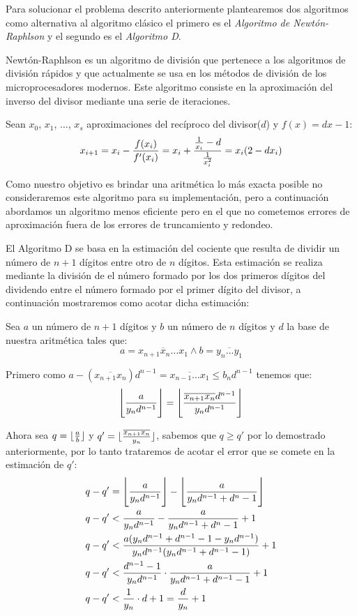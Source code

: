 \documentclass[a4paper,10pt,twocolumn]{article}
\begin{document}
	Para solucionar el problema descrito anteriormente plantearemos dos algoritmos como alternativa al algoritmo clásico el primero es el \emph{Algoritmo de Newtón-Raphlson} y el segundo es el \emph{Algoritmo D}.
	
	Newtón-Raphlson es un algoritmo de división que pertenece a los algoritmos de división rápidos y que actualmente se usa en los métodos de división de los microprocesadores modernos. Este algoritmo consiste en la aproximación del inverso del divisor mediante una serie de iteraciones.
	
	Sean $x_0$, $x_1$, $\ldots$, $x_s$ aproximaciones del recíproco del divisor($d$) y $f(x)=dx-1$:
	\begin{equation}
		x_{i+1}=x_i-{f(x_i)\over f'(x_i)}=x_i+{{1\over x_i}-d\over{1\over x^2_i}} =x_i(2-dx_i)
	\end{equation}
	
	Como nuestro objetivo es brindar una aritmética lo más exacta posible no consideraremos este algoritmo para su implementación, pero a continuación abordamos un algoritmo menos eficiente pero en el que no cometemos errores de aproximación fuera de los errores de truncamiento y redondeo.
	
	El Algoritmo D se basa en la estimación del cociente que resulta de dividir un número de $n+1$ dígitos entre otro de $n$ dígitos. Esta estimación se realiza mediante la división de el número formado por los dos primeros dígitos del dividendo entre el número formado por el primer dígito del divisor, a continuación mostraremos como acotar dicha estimación:
	
	Sea $a$ un número de $n+1$ dígitos y $b$ un número de $n$ dígitos y $d$ la base de nuestra aritmética tales que:
		$$a=\overline{x_{n+1}x_n\ldots x_1} \wedge b=\overline{y_n\ldots y_1}$$	 
	
	Primero como $a-(\overline{x_{n+1}x_n}) d^{n-1}= \overline{x_{n-1}\ldots x_1}\leq b_n d^{n-1}$ tenemos que:
	\begin{equation}
		\Bigg\lfloor{a \over y_nd^{n-1}}\Bigg\rfloor = \Bigg\lfloor{\overline{x_{n+1}x_n} d^{n-1} \over y_n d^{n-1}}\Bigg\rfloor
	\end{equation}
	
	Ahora sea $q=\lfloor{a \over b}\rfloor$ y $q'=\lfloor{\overline{x_{n+1}x_n} \over y_n}\rfloor$, sabemos que $q\geq q'$ por lo demostrado anteriormente, por lo tanto trataremos de acotar el error que se comete en la estimación de $q'$:
	\begin{equation}
		\begin{split}
			&q-q'=\Bigg\lfloor{a \over y_n d^{n-1}}\Bigg\rfloor-\Bigg\lfloor{a \over y_n d^{n-1}+d^n-1}\Bigg\rfloor\\ 
			&q-q'<{a \over y_n d^{n-1}}-{a \over y_n d^{n-1}+d^n-1}+1\\
			&q-q'<{a(y_n d^{n-1}+d^{n-1}-1-y_n d^{n-1})\over y_n d^{n-1}(y_n d^{n-1}+d^{n-1}-1)}+1\\
			&q-q'<{d^{n-1}-1\over y_n d^{n-1}}\cdot {a
\over y_n d^{n-1}+d^{n-1}-1}+1\\
			&q-q'<{1\over y_n}\cdot d+1={d\over y_n}+1
		\end{split}
	\end{equation}
	
\end{document}
